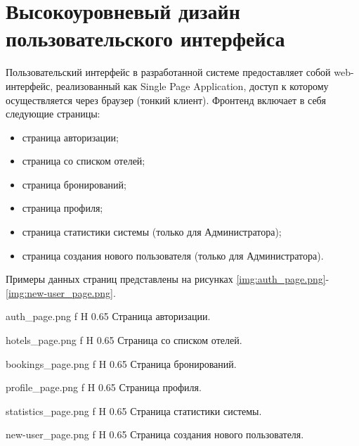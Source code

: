 \section{Высокоуровневый дизайн пользовательского интерфейса}
Пользовательский интерфейс в разработанной системе предоставляет собой web-интерфейс, реализованный как Single Page Application, доступ к которому осуществляется через браузер (тонкий клиент). Фронтенд включает в себя следующие страницы:
\begin{itemize}
	\item страница авторизации;
	\item страница со списком отелей;
	\item страница бронирований;
	\item страница профиля;
	\item страница статистики системы (только для Администратора);
	\item страница создания нового пользователя (только для Администратора).
\end{itemize}

Примеры данных страниц представлены на рисунках \ref{img:auth_page.png}-\ref{img:new-user_page.png}.

{auth_page.png}
{f}
{H}
{0.65\textheight}
{Страница авторизации.}

{hotels_page.png}
{f}
{H}
{0.65\textheight}
{Страница со списком отелей.}

{bookings_page.png}
{f}
{H}
{0.65\textheight}
{Страница бронирований.}

{profile_page.png}
{f}
{H}
{0.65\textheight}
{Страница профиля.}

{statistics_page.png}
{f}
{H}
{0.65\textheight}
{Страница статистики системы.}

{new-user_page.png}
{f}
{H}
{0.65\textheight}
{Страница создания нового пользователя.}
